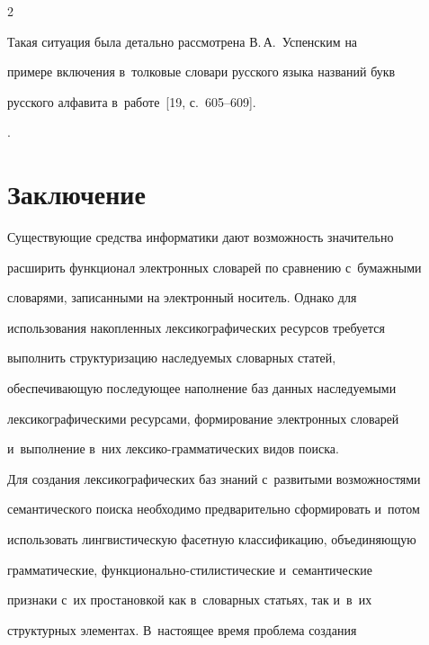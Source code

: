\begin{multicols}{2}
{Такая ситуация была детально рассмотрена В.\,А.~Успенским на 


примере включения в~толковые словари русского языка названий букв 


русского алфавита в~работе~[19, с.~605--609].}.





\vspace*{-6pt}





\section{Заключение}





\vspace*{-3pt}





  Существующие средства информатики дают возможность значительно 


расширить функционал электронных словарей по сравнению с~\mbox{бумажными} 


словарями, записанными на электронный носитель. Однако для 


использования накопленных лексикографических ресурсов требуется 


выполнить структуризацию наследуемых словарных статей, 


обеспечивающую последующее наполнение баз данных наследуемыми 


лексикографическими ресурсами, формирование электронных словарей 


и~выполнение в~них лек\-си\-ко-грам\-ма\-ти\-че\-ских видов поиска.


  


  Для создания лексикографических баз знаний с~развитыми возможностями 


семантического поиска необходимо предварительно сформировать и~потом 


использовать лингвистическую фасетную классификацию, объединяющую 


грамматические, функ\-ци\-о\-наль\-но-сти\-ли\-сти\-че\-ские и~семантические 


признаки с~их простановкой как в~словарных стать\-ях, так и~в~их 


структурных элементах. В~настоящее время проблема создания 



\end{multicols}
